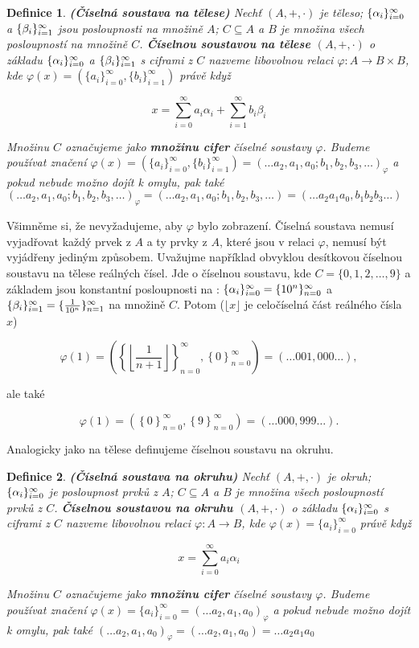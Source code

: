 \documentclass[12pt]{book}
\newtheorem{definice}{Definice}
\begin{document}
\begin{definice} \textbf{(Číselná soustava na tělese)}
	Nechť $(A,+,\cdot)$ je těleso; $\{\alpha_i\}_{i=0}^{\infty}$ a $\{\beta_i\}_{i=1}^{\infty}$ jsou posloupnosti na množině $A$; $C\subseteq A$ a $B$ je množina všech posloupností na množině $C$.
	\textbf{Číselnou soustavou na tělese $(A,+,\cdot)$} o základu $\{\alpha_i\}_{i=0}^{\infty}$ a $\{\beta_i\}_{i=1}^{\infty}$ s ciframi z $C$ nazveme libovolnou relaci $\varphi : A \rightarrow B\times B$, kde 	$\varphi(x)=\left(\{a_{i}\}_{i=0}^{\infty},\{b_{i}\}_{i=1}^{\infty}\right)$ právě když

		$$x = \sum_{i=0}^{\infty} a_{i}\alpha_{i} + \sum_{i=1}^{\infty} b_{i}\beta_{i}$$

		Množinu $C$ označujeme jako \textbf{množinu cifer} číselné soustavy $\varphi$. Budeme používat značení $\varphi(x) = \left(\{a_{i}\}_{i=0}^{\infty},\{b_{i}\}_{i=1}^{\infty}\right) = (\dots a_2,a_1,a_0;b_1, b_2, b_3, \dots)_{\varphi}$ a pokud nebude možno dojít k omylu, pak také $(\dots a_2,a_1,a_0;b_1, b_2, b_3, \dots)_{\varphi} = (\dots a_2,a_1,a_0;b_1, b_2, b_3, \dots) = (\dots a_2a_1a_0,b_1 b_2 b_3 \dots)$
		\end{definice}

Všimněme si, že nevyžadujeme, aby $\varphi$ bylo zobrazení. Číselná soustava nemusí vyjadřovat každý prvek z $A$ a ty prvky z $A$, které jsou v relaci $\varphi$, nemusí být vyjádřeny jediným způsobem. Uvažujme například obvyklou desítkovou číselnou soustavu na tělese reálných čísel. Jde o číselnou soustavu, kde $C = \{0, 1, 2, \dots, 9\}$ a základem jsou konstantní posloupnosti na : $\{\alpha_i\}_{i=0}^{\infty} = \{10^n\}_{n = 0}^{\infty}$ a $\{\beta_i\}_{i=1}^{\infty} = \{\frac{1}{10^n}\}_{n = 1}^{\infty}$ na množině $C$. Potom ($\lfloor x\rfloor$ je celočíselná část reálného čísla $x$)  

$$\varphi(1) = \left(  \left\{ \left\lfloor\frac{1}{n+1} \right\rfloor \right\}_{n = 0}^{\infty} , \left\{ 0 \right\}_{n = 0}^{\infty} \right) = \left(\dots 001,000 \dots \right),$$

ale také

$$\varphi(1) = \left(  \left\{ 0 \right\}_{n = 0}^{\infty} , \left\{ 9 \right\}_{n = 0}^{\infty} \right) = \left(\dots 000,999 \dots \right).$$


Analogicky jako na tělese definujeme číselnou soustavu na okruhu.


\begin{definice} \textbf{(Číselná soustava na okruhu)}
	Nechť $(A,+,\cdot)$ je okruh; $\{\alpha_i\}_{i=0}^{\infty}$ je posloupnost prvků z $A$; $C\subseteq A$ a $B$ je množina všech posloupností prvků z $C$.
	\textbf{Číselnou soustavou na okruhu $(A,+,\cdot)$} o základu $\{\alpha_i\}_{i=0}^{\infty}$ s ciframi z $C$ nazveme libovolnou relaci $\varphi : A \rightarrow B$, kde 	$\varphi(x)= \{a_{i}\}_{i=0}^{\infty}$ právě když

		$$x = \sum_{i=0}^{\infty} a_{i}\alpha_{i}$$

		Množinu $C$ označujeme jako \textbf{množinu cifer} číselné soustavy $\varphi$. Budeme používat značení $\varphi(x) = \{a_{i}\}_{i=0}^{\infty} = (\dots a_2,a_1,a_0)_{\varphi}$ a pokud nebude možno dojít k omylu, pak také $(\dots a_2,a_1,a_0)_{\varphi} = (\dots a_2,a_1,a_0) = \dots a_2a_1a_0$
		\end{definice}
\end{document}
